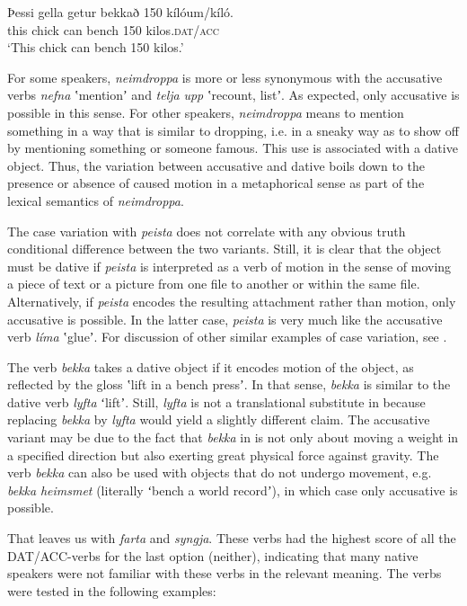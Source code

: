 \documentclass[output=paper,modfonts,nonflat,colorlinks,citecolor=brown]{langsci/langscibook}
\begin{document}
\ex\label{ex:jonsson:7e}
\gll   Þessi  gella  getur  bekkað  150  kílóum/kíló.\\
 this  chick  can  bench  150  kilos.\textsc{dat/acc}\\
\glt `This chick can bench 150 kilos.'
\z
\z


For some speakers, \textit{neimdroppa} is more or less synonymous with the accusative verbs \textit{nefna} ʽmentionʼ and \textit{telja} \textit{upp} ʽrecount, listʼ. As expected, only accusative is possible in this sense. For other speakers,  \textit{neimdroppa} means to mention something in a way that is similar to dropping, i.e. in a sneaky way as to show off by mentioning something or someone famous. This use is associated with a dative object. Thus, the variation between accusative and dative boils down to the presence or absence of caused motion in a metaphorical sense as part of the lexical semantics of \textit{neimdroppa}.

The case variation with \textit{peista} does not correlate with any obvious truth conditional difference between the two variants. Still, it is clear that the object must be dative if \textit{peista} is interpreted as a verb of motion in the sense of moving a piece of text or a picture from one file to another or within the same file. Alternatively, if \textit{peista} encodes the resulting attachment rather than motion, only accusative is possible. In the latter case, \textit{peista} is very much like the accusative verb \textit{líma} ʽglueʼ. For discussion of other similar examples of case variation, see \citet{Jónsson2013a}.

The verb \textit{bekka} takes a dative object if it encodes motion of the object, as reflected by the gloss ʽlift in a bench pressʼ. In that sense, \textit{bekka} is similar to the dative verb \textit{lyfta} ʻliftʼ. Still, \textit{lyfta} is not a translational substitute in  because replacing \textit{bekka} by \textit{lyfta} would yield a slightly different claim. The accusative variant may be due to the fact that \textit{bekka} in  is not only about moving a weight in a specified direction but also exerting great physical force against gravity. The verb \textit{bekka} can also be used with objects that do not undergo movement, e.g. \textit{bekka} \textit{heimsmet} (literally ʻbench a world recordʼ), in which case only accusative is possible.

That leaves us with \textit{farta} and \textit{syngja}. These verbs had the highest score of all the DAT/ACC-verbs for the last option (neither), indicating that many native speakers were not familiar with these verbs in the relevant meaning. The verbs were tested in the following examples:
\end{document}
